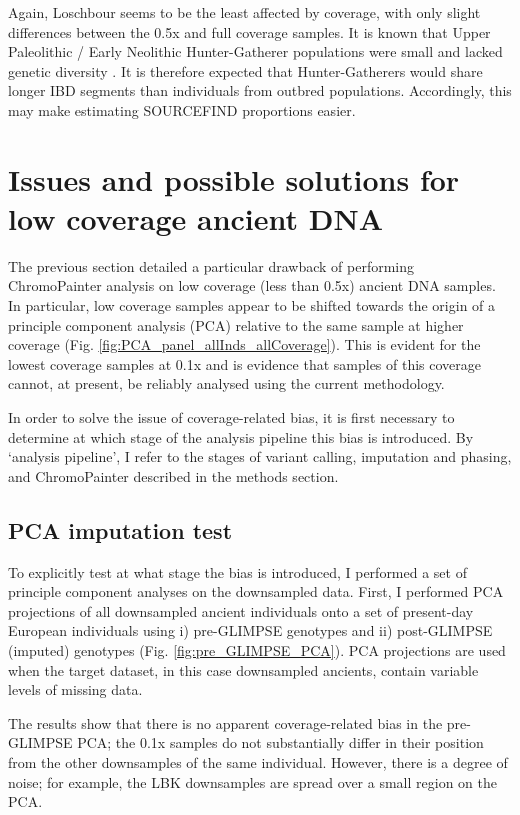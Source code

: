 Again, Loschbour seems to be the least affected by coverage, with only slight differences between the 0.5x and full coverage samples. It is known that Upper Paleolithic / Early Neolithic Hunter-Gatherer populations were small and lacked genetic diversity \cite{excoffier1999hunter, Lazaridis2014, Fu2016}. It is therefore expected that Hunter-Gatherers would share longer IBD segments than individuals from outbred populations. Accordingly, this may make estimating SOURCEFIND proportions easier.


\section{Issues and possible solutions for low coverage ancient DNA}

The previous section detailed a particular drawback of performing ChromoPainter analysis on low coverage (less than 0.5x) ancient DNA samples. In particular, low coverage samples appear to be shifted towards the origin of a principle component analysis (PCA) relative to the same sample at higher coverage (Fig. \ref{fig:PCA_panel_allInds_allCoverage}). This is evident for the lowest coverage samples at 0.1x and is evidence that samples of this coverage cannot, at present, be reliably analysed using the current methodology.

In order to solve the issue of coverage-related bias, it is first necessary to determine at which stage of the analysis pipeline this bias is introduced. By `analysis pipeline', I refer to the stages of variant calling, imputation and phasing, and ChromoPainter described in the methods section.

\subsection{PCA imputation test}

To explicitly test at what stage the bias is introduced, I performed a set of principle component analyses on the downsampled data. First, I performed PCA projections of all downsampled ancient individuals onto a set of present-day European individuals using i) pre-GLIMPSE genotypes and ii) post-GLIMPSE (imputed) genotypes (Fig. \ref{fig:pre_GLIMPSE_PCA}). PCA projections are used when the target dataset, in this case downsampled ancients, contain variable levels of missing data.  

The results show that there is no apparent coverage-related bias in the pre-GLIMPSE PCA; the 0.1x samples do not substantially differ in their position from the other downsamples of the same individual. However, there is a degree of noise; for example, the LBK downsamples are spread over a small region on the PCA. 

